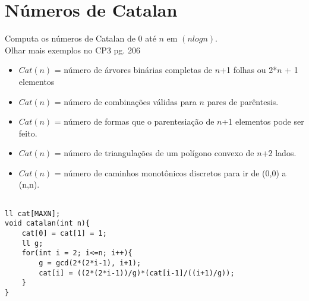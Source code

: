 \section{Números de Catalan}
Computa os números de Catalan de 0 até $n$ em $(nlogn)$.\\
Olhar mais exemplos no CP3 pg. 206
\begin{itemize}
\itemsep0em
\item $Cat(n)$ = número de árvores binárias completas de $n$+1 folhas ou 2*$n$ + 1 elementos
\item $Cat(n)$ = número de combinações válidas para $n$ pares de parêntesis.
\item $Cat(n)$ = número de formas que o parentesiação de $n$+1 elementos pode ser feito.
\item $Cat(n)$ = número de triangulações de um polígono convexo de $n$+2 lados.
\item $Cat(n)$ = número de caminhos monotônicos discretos para ir de (0,0) a (n,n).
\end{itemize}

\begin{multicols}{2}
\begin{lstlisting}

ll cat[MAXN];
void catalan(int n){
	cat[0] = cat[1] = 1;
	ll g;
	for(int i = 2; i<=n; i++){
		g = gcd(2*(2*i-1), i+1);
		cat[i] = ((2*(2*i-1))/g)*(cat[i-1]/((i+1)/g));
	}
}	

\end{lstlisting}
\end{multicols}

